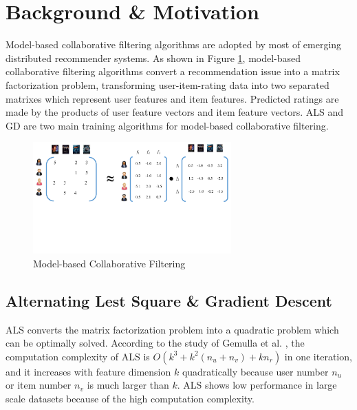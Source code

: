 \documentclass{llncs}
\begin{document}

\section{Background \& Motivation}
\vspace{-5pt}

\label{sec:background}

Model-based collaborative filtering algorithms are adopted by most of emerging distributed recommender systems. As shown in Figure \ref{fig:MF}, model-based collaborative filtering algorithms convert a recommendation issue into a matrix factorization problem, transforming user-item-rating data into two separated matrixes which represent user features and item features. Predicted ratings are made by the products of user feature vectors and item feature vectors.
ALS and GD are two main training algorithms for model-based collaborative filtering.
\vspace{-20pt}

\begin{figure}[!htb]
\centering
\includegraphics[width=3in]{pics/MFIntroduction.pdf}
\vspace{-60pt}
\caption{Model-based Collaborative Filtering}
\vspace{-15pt}
\label{fig:MF}
\end{figure}

\vspace{-20pt}
\subsection{Alternating Lest Square \& Gradient Descent}
\label{sub:gd}
\vspace{-5pt}

ALS \cite{ALS} converts the matrix factorization problem into a quadratic problem which can be optimally solved. According to the study of Gemulla et al. \cite{ibm2011}, the computation complexity of ALS is $O(k^3 + k^2(n_u + n_v) + kn_r)$ in one iteration, and it increases with feature dimension $k$ quadratically because user number $n_u$ or item number $n_v$ is much larger than $k$. ALS shows low performance in large scale datasets because of the high computation complexity.
\end{document}
